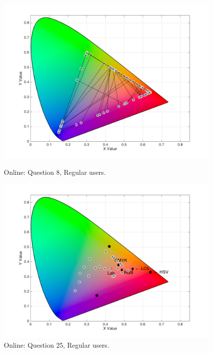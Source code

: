 \begin{figure}[!htbp]
  \centering
  \vspace{-5pt}
  \begin{minipage}{0.4\textwidth}
    \centering
    \includegraphics[width=\textwidth]{images/results/8_online_regularUsers.png}
    \caption[Online: Answers for Question 8, from regular users.]{Online: Question 8, Regular users.}
    \label{fig:redblend_1}
  \end{minipage}
  \begin{minipage}{0.4\textwidth}
    \centering
    \includegraphics[width=\textwidth]{images/results/25_online_regularUsers.png}
    \caption[Online: Answers for Question 25, from regular users.]{Online: Question 25, Regular users.}
    \label{fig:redblend_2}
  \end{minipage}
  \vspace{-5pt}
\end{figure}
%

